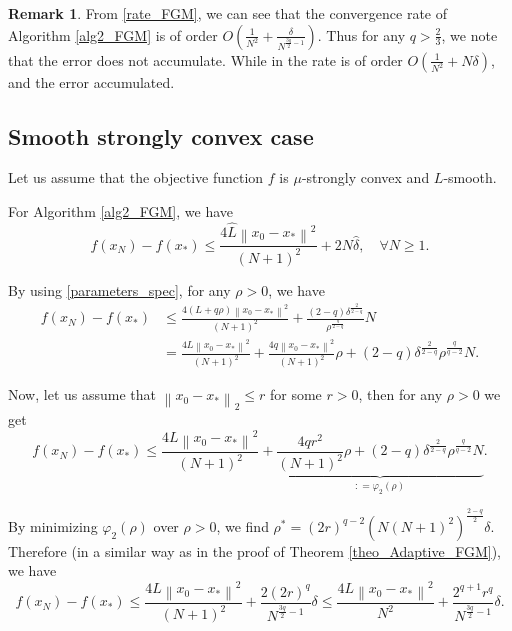 \documentclass[11pt]{amsart}
\theoremstyle{definition}
\newtheorem{remark}[theorem]{Remark}
\numberwithin{equation}{section}
\begin{document}
\begin{remark}
From \eqref{rate_FGM}, we can see that the convergence rate of Algorithm \ref{alg2_FGM} is of order $O\left( \frac{1}{N^2} + \frac{\delta}{N^{\frac{3q}{2} - 1}} \right)$. Thus for any $q > \frac{2}{3}$, we note that the error does not accumulate. While in \cite{Devolder2013smooth,Gasnikov2019fast,Stonyakin2021OMS} the rate is of order $O\left( \frac{1}{N^2} + N\delta \right)$, and the error accumulated.   
\end{remark}


\subsection{Smooth strongly convex case}\label{subsect:strongly}
Let us assume that the objective function $f$ is $\mu$-strongly convex and $L$-smooth.  

For Algorithm \ref{alg2_FGM}, we have \cite{Gasnikov2019fast}
\begin{equation*}
    f(x_N) - f(x_*) \leq \frac{4 \widehat{L} \left \|x_0 - x_* \right\|^2}{(N+1)^2} + 2 N \widehat{\delta}, \quad \forall N \geq 1. 
\end{equation*} 

By using \eqref{parameters_spec}, for any $\rho > 0$, we have
\begin{align*}
    f(x_N) - f(x_*) & \leq \frac{4 (L + q \rho) \left\|x_0 - x_* \right\|^2}{(N+1)^2} + \frac{(2-q) \delta^{\frac{2}{2-q}}}{ \rho^{\frac{q}{2-q}}} N 
    \\& = \frac{4 L \left \|x_0 - x_* \right \|^2}{(N+1)^2} + \frac{4 q \left\|x_0 - x_* \right\|^2}{(N+1)^2} \rho + (2-q) \delta^{\frac{2}{2-q}} \rho^{\frac{q}{q-2}} N.
\end{align*} 

Now, let us assume that $\left\|x_0 - x_* \right\|_2 \leq r$ for some $r>0$, then for any $\rho > 0$ we get 
\begin{equation*}
    f(x_N) - f(x_*) \leq \frac{4 L \left \|x_0 - x_* \right\|^2}{(N+1)^2} + \underbrace{\frac{4 q r^2}{(N+1)^2} \rho + (2-q) \delta^{\frac{2}{2-q}} \rho^{\frac{q}{q-2}} N}_{: = \varphi_2(\rho)}. 
\end{equation*} 

By minimizing $\varphi_2(\rho)$ over $\rho >0$, we find $\rho^* = (2r)^{q-2} \left(N(N+1)^2\right)^{\frac{2-q}{2}} \delta$. Therefore (in a similar way as in the proof of Theorem \ref{theo_Adaptive_FGM}), we have 
\begin{equation}\label{eq_120bv2gf}
    f(x_N) - f(x_*)  \leq \frac{4 L \left \|x_0 - x_* \right\|^2}{(N+1)^2} + \frac{2 (2r)^q}{N^{\frac{3q}{2} - 1}} \delta \leq \frac{4 L \left\|x_0 - x_* \right\|^2}{N^2} + \frac{2^{q+1} r^q}{N^{\frac{3q}{2} - 1}} \delta.
\end{equation}
     
\end{document}
